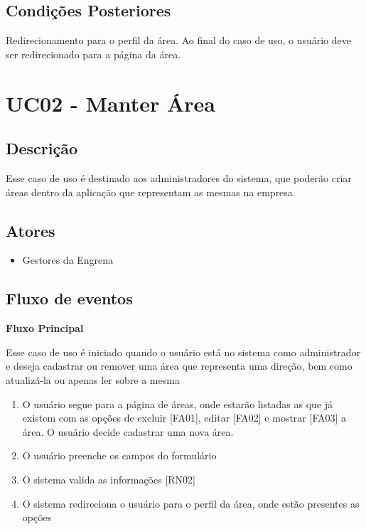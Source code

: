 \begin{apendicesenv}
\subsection{Condições Posteriores}

Redirecionamento para o perfil da área. Ao final do caso de uso, o usuário deve ser redirecionado para a página da área.


\section{UC02 - Manter Área}

\subsection{Descrição}

Esse caso de uso é destinado aos administradores do sistema, que poderão criar áreas dentro da aplicação que representam as mesmas na empresa.

\subsection{Atores}

\begin{itemize}
  \item{Gestores da Engrena}
\end{itemize}

\subsection{Fluxo de eventos}

\textbf{Fluxo Principal}

Esse caso de uso é iniciado quando o usuário está no sistema como administrador e deseja cadastrar ou remover uma área que representa uma direção, bem como atualizá-la ou apenas ler sobre a mesma

\begin{enumerate}
  \item{O usuário segue para a página de áreas, onde estarão listadas as que já existem com as opções de excluir [FA01], editar [FA02] e mostrar [FA03] a área. O usuário decide cadastrar uma nova área.}
  \item{O usuário preenche os campos do formulário}
  \item{O sistema valida as informações [RN02]}
  \item{O sistema redireciona o usuário para o perfil da área, onde estão presentes as opções}
\end{enumerate}



\end{apendicesenv}
